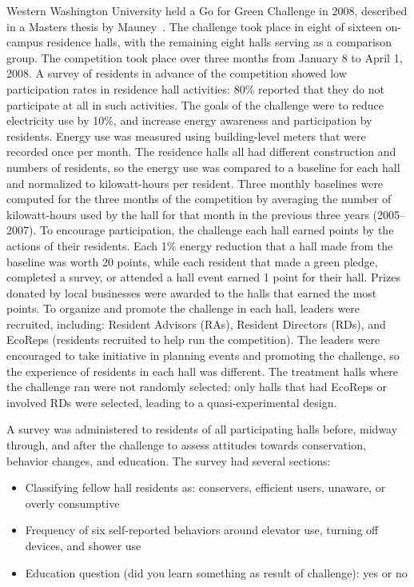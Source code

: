 Western Washington University held a Go for Green Challenge in 2008, described in a Masters thesis by Mauney~\cite{Mauney-thesis}. The challenge took place in eight of sixteen on-campus residence halls, with the remaining eight halls serving as a comparison group. The competition took place over three months from January 8 to April 1, 2008. A survey of residents in advance of the competition showed low participation rates in residence hall activities: 80\% reported that they do not participate at all in such activities. The goals of the challenge were to reduce electricity use by 10\%, and increase energy awareness and participation by residents. Energy use was measured using building-level meters that were recorded once per month. The residence halls all had different construction and numbers of residents, so the energy use was compared to a baseline for each hall and normalized to kilowatt-hours per resident. Three monthly baselines were computed for the three months of the competition by averaging the number of kilowatt-hours used by the hall for that month in the previous three years (2005--2007). To encourage participation, the challenge each hall earned points by the actions of their residents. Each 1\% energy reduction that a hall made from the baseline was worth 20 points, while each resident that made a green pledge, completed a survey, or attended a hall event earned 1 point for their hall. Prizes donated by local businesses were awarded to the halls that earned the most points. To organize and promote the challenge in each hall, leaders were recruited, including: Resident Advisors (RAs), Resident Directors (RDs), and EcoReps (residents recruited to help run the competition). The leaders were encouraged to take initiative in planning events and promoting the challenge, so the experience of residents in each hall was different. The treatment halls where the challenge ran were not randomly selected: only halls that had EcoReps or involved RDs were selected, leading to a quasi-experimental design.

A survey was administered to residents of all participating halls before, midway through, and after the challenge to assess attitudes towards conservation, behavior changes, and education. The survey had several sections:

\begin{itemize}
	\item Classifying fellow hall residents as: conservers, efficient users, unaware, or overly consumptive
	\item Frequency of six self-reported behaviors around elevator use, turning off devices, and shower use
	\item Education question (did you learn something as result of challenge): yes or no
\end{itemize}

